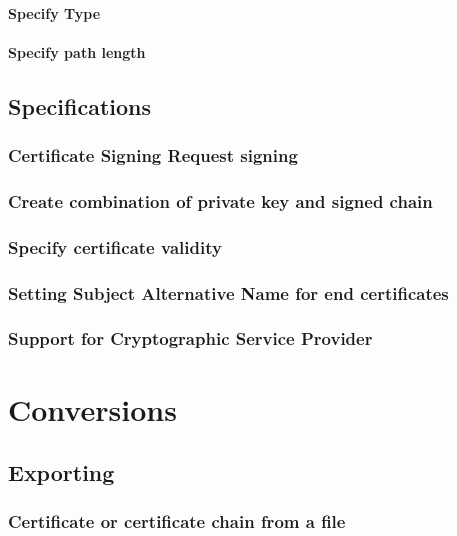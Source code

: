 \documentclass[10pt, a4paper]{report}
\begin{document}
      \paragraph{Specify Type}
      
      \paragraph{Specify path length}
      
  \subsection{Specifications}
  
    \subsubsection{Certificate Signing Request signing}
    
    \subsubsection{Create combination of private key and signed chain}
    
    \subsubsection{Specify certificate validity}
    
    \subsubsection{Setting Subject Alternative Name for end certificates}
    
    \subsubsection{Support for Cryptographic Service Provider}
    
\section{Conversions}

  \subsection{Exporting}
  
    \subsubsection{Certificate or certificate chain from a file}
    
\end{document}

